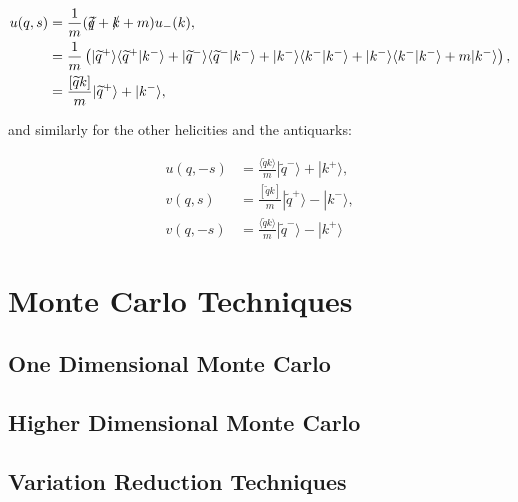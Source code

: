 	\begin{subequations}
	\begin{align*}
		u(q, s) &= \frac{1}{m}(\slashed{\widetilde{q}} + \slashed{k} + m)u_-(k), \\
		        &= \frac{1}{m}\left(|\widetilde{q}^+ \rangle\langle \widetilde{q}^+|k^-\rangle + |\widetilde{q}^- \rangle\langle \widetilde{q}^-|k^-\rangle + |k^- \rangle\langle k^-|k^-\rangle + |k^- \rangle\langle k^-|k^-\rangle + m|k^-\rangle\right), \\
		        &= \frac{[\widetilde{q}k]}{m}|\widetilde{q}^+\rangle + |k^-\rangle,
	\end{align*}
	\end{subequations}

	and similarly for the other helicities and the antiquarks:

	\begin{subequations}
	\begin{align}
		u(q, -s) &= \frac{\langle \widetilde{q}k\rangle}{m}|\widetilde{q}^-\rangle + |k^+\rangle, \\
		v(q,  s) &= \frac{[\widetilde{q}k]}{m}|\widetilde{q}^+\rangle - |k^-\rangle, \\
		v(q, -s) &= \frac{\langle \widetilde{q}k\rangle}{m}|\widetilde{q}^-\rangle - |k^+\rangle
	\end{align}
	\end{subequations}

\section{Monte Carlo Techniques}
\label{sec:MC}

\subsection{One Dimensional Monte Carlo}
\label{sub:MCOneD}

\subsection{Higher Dimensional Monte Carlo}
\label{sub:MCND}

\subsection{Variation Reduction Techniques}
\label{sub:VarReduction}

